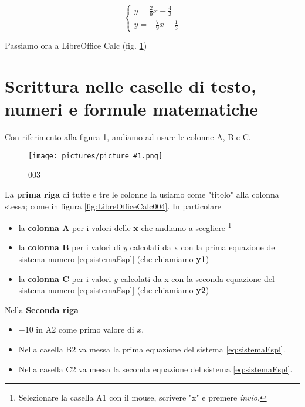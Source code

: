 \documentclass[17pt]{extarticle}
\newcommand{\pict}[1]{
\begin{figure}[h!]		
	\centering
   	\texttt{[image: pictures/picture\_\#1.png]}
  	\caption{#1}
   	\label{fig:LibreOfficeCalc#1}
\end{figure}
}
\begin{document}
\begin{equation}\label{eq:sistemaEspl}
  	\begin{cases}
		y = \frac{2}{9}x - \frac{4}{3}\\
		y = -\frac{7}{9}x - \frac{1}{3}
	\end{cases}
\end{equation}


Passiamo ora a LibreOffice Calc (fig. \ref{fig:LibreOfficeCalc003})
%


\section{Scrittura nelle caselle di testo, numeri e formule matematiche}

Con riferimento alla figura \ref{fig:LibreOfficeCalc003}, andiamo ad usare le colonne A, B e C. 

\pict{003}

La {\bf prima riga } di tutte e tre le colonne la usiamo come "titolo" alla colonna stessa; come in figura \ref{fig:LibreOfficeCalc004}. In particolare

\begin{itemize}
	\item la {\bf colonna A} per i valori delle {\bf x} che andiamo a scegliere \footnote{Selezionare la casella A1 con il mouse, scrivere "x" e premere \emph{invio}. }
	\item la {\bf colonna B} per i valori di $y$ calcolati da x con la prima equazione del sistema numero \ref{eq:sistemaEspl} (che chiamiamo {\bf y1})
	\item la {\bf colonna C} per i valori $y$ calcolati da x con la seconda equazione del sistema numero \ref{eq:sistemaEspl} (che chiamiamo {\bf y2})
\end{itemize}

\vspace{1cm}

Nella {\bf Seconda riga} 

\begin{itemize}
	\item $-10$ in A2  come primo valore di $x$.
	\item Nella casella B2 va messa la prima equazione del sistema \ref{eq:sistemaEspl}.
	\item Nella casella C2 va messa la seconda equazione del sistema \ref{eq:sistemaEspl}.
\end{itemize}
\end{document}
